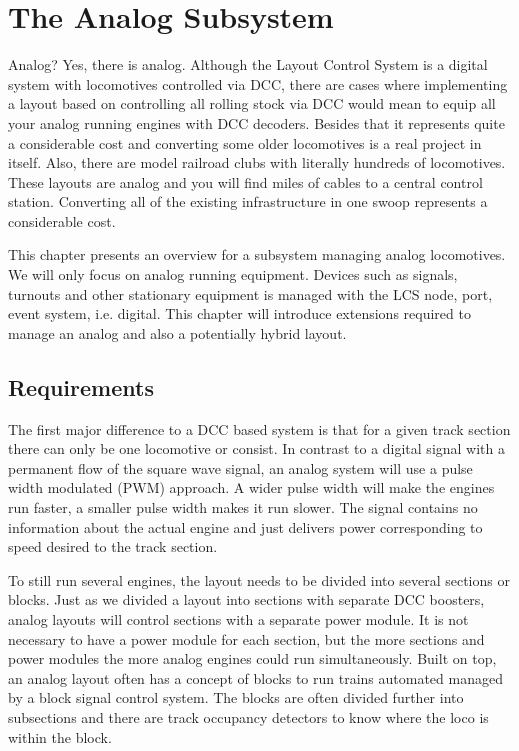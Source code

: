 \chapter{The Analog Subsystem}

Analog? Yes, there is analog. Although the Layout Control System is a digital system with locomotives controlled via DCC, there are cases where implementing a layout based on controlling all rolling stock via DCC would mean to equip all your analog running engines with DCC decoders. Besides that it represents quite a considerable cost and converting some older locomotives is a real project in itself. Also, there are model railroad clubs with literally hundreds of locomotives. These layouts are analog and you will find miles of cables to a central control station. Converting all of the existing infrastructure in one swoop represents a considerable cost.

This chapter presents an overview for a subsystem managing analog locomotives. We will only focus on analog running equipment. Devices such as signals, turnouts and other stationary equipment is managed with the LCS node, port, event system, i.e. digital. This chapter will introduce extensions required to manage an analog and also a potentially hybrid layout.

\section{Requirements}

The first major difference to a DCC based system is that for a given track section there can only be one locomotive or consist. In contrast to a digital signal with a permanent flow of the square wave signal, an analog system will use a pulse width modulated (PWM) approach. A wider pulse width will make the engines run faster, a smaller pulse width makes it run slower. The signal contains no information about the actual engine and just delivers power corresponding to speed desired to the track section.

To still run several engines, the layout needs to be divided into several sections or blocks. Just as we divided a layout into sections with separate DCC boosters, analog layouts will control sections with a separate power module. It is not necessary to have a power module for each section, but the more sections and power modules the more analog engines could run simultaneously. Built on top, an analog layout often has a concept of blocks to run trains automated managed by a block signal control system. The blocks are often divided further into subsections and there are track occupancy detectors to know where the loco is within the block.

